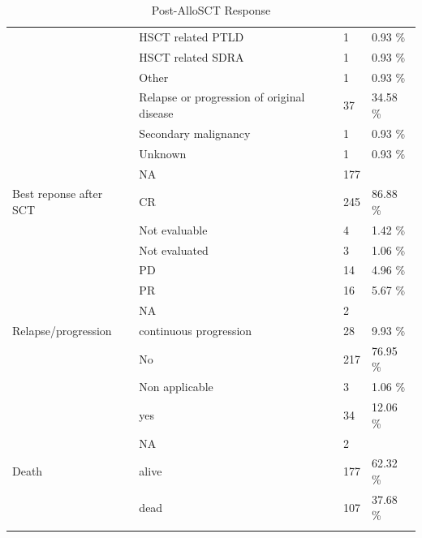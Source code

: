 \documentclass[a4paper,11pt] {article}
\begin{document}
\begin{longtable}{llll}
   & HSCT related PTLD & 1 & 0.93 \% \\ 
   & HSCT related SDRA & 1 & 0.93 \% \\ 
   & Other & 1 & 0.93 \% \\ 
   & Relapse or progression of original disease & 37 & 34.58 \% \\ 
   & Secondary malignancy & 1 & 0.93 \% \\ 
   & Unknown & 1 & 0.93 \% \\ 
   & NA & 177 &  \\ 
  Best reponse after SCT & CR & 245 & 86.88 \% \\ 
   & Not evaluable & 4 & 1.42 \% \\ 
   & Not evaluated & 3 & 1.06 \% \\ 
   & PD & 14 & 4.96 \% \\ 
   & PR & 16 & 5.67 \% \\ 
   & NA & 2 &  \\ 
  Relapse/progression & continuous progression & 28 & 9.93 \% \\ 
   & No & 217 & 76.95 \% \\ 
   & Non applicable  & 3 & 1.06 \% \\ 
   & yes & 34 & 12.06 \% \\ 
   & NA & 2 &  \\ 
  Death & alive & 177 & 62.32 \% \\ 
   & dead & 107 & 37.68 \% \\ 
   \hline
\hline
\caption{Post-AlloSCT Response} 
\label{tab:pg}
\end{longtable}
\end{document}
